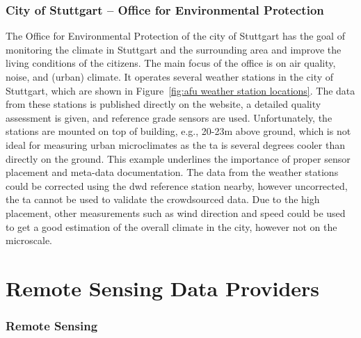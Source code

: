 \subsubsection{City of Stuttgart – Office for Environmental Protection}

The Office for Environmental Protection of the city of Stuttgart has the goal of monitoring the climate in Stuttgart and the surrounding area and improve the living conditions of the citizens. The main focus of the office is on air quality, noise, and (urban) climate. It operates several weather stations in the city of Stuttgart, which are shown in Figure~\ref{fig:afu weather station locations}. The data from these stations is published directly on the website, a detailed quality assessment is given, and reference grade sensors are used. Unfortunately, the stations are mounted on top of building, e.g., 20-23m above ground, which is not ideal for measuring urban microclimates as the \gls{ta} is several degrees cooler than directly on the ground. This example underlines the importance of proper sensor placement and meta-data documentation. The data from the weather stations could be corrected using the \gls{dwd} reference station nearby, however uncorrected, the \gls{ta} cannot be used to validate the crowdsourced data. Due to the high placement, other measurements such as wind direction and speed could be used to get a good estimation of the overall climate in the city, however not on the microscale.

\section{Remote Sensing Data Providers}

\subsubsection{Remote Sensing}
\label{subsec: remote sensing}

